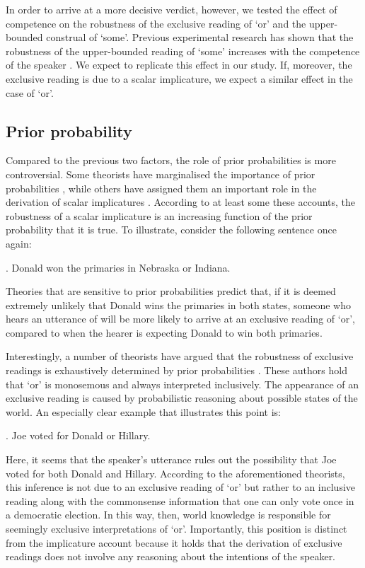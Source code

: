 \documentclass[12pt]{article}
\begin{document}
In order to arrive at a more decisive verdict, however, we tested the effect of competence on the robustness of the exclusive reading of `or' and the upper-bounded construal of `some'. Previous experimental research has shown that the robustness of the upper-bounded reading of `some' increases with the competence of the speaker \citep{goodman2013}. We expect to replicate this effect in our study. If, moreover, the exclusive reading is due to a scalar implicature, we expect a similar effect in the case of `or'.

\subsection*{Prior probability}

Compared to the previous two factors, the role of prior probabilities is more controversial. Some theorists have marginalised the importance of prior probabilities \citep{geurts2010}, while others have assigned them an important role in the derivation of scalar implicatures \citep[e.g.,][]{Russell2012:Probabilistic-R,frank2012, FrankeJager2015:Probabilistic-p}. According to at least some these accounts, the robustness of a scalar implicature is an increasing function of the prior probability that it is true. To
illustrate, consider the following sentence once again:

\ex.	Donald won the primaries in Nebraska or Indiana.

Theories that are sensitive to prior probabilities predict that, if it is deemed extremely unlikely that Donald wins the primaries in both states, someone who hears an utterance of \Last will be more likely to arrive at an exclusive reading of `or', compared to when the hearer is expecting Donald to win both primaries.

Interestingly, a number of theorists have argued that the robustness of exclusive readings is exhaustively determined by prior probabilities \citep[e.g.,][]{rubin1989, yanal1988}. These authors hold that `or' is monosemous and always interpreted inclusively. The appearance of an exclusive reading is caused by probabilistic reasoning about possible states of the world. An especially clear example that illustrates this point is:

\ex.	Joe voted for Donald or Hillary.

Here, it seems that the speaker's utterance rules out the possibility that Joe voted for both Donald and Hillary. According to the aforementioned theorists, this inference is not due to an exclusive reading of `or' but rather to an inclusive reading along with the commonsense information that one can only vote once in a democratic election. In this way, then, world knowledge is responsible for seemingly exclusive interpretations of `or'. Importantly, this position is distinct from the implicature account because it holds that the derivation of exclusive readings does not involve any reasoning about the intentions of the speaker.
\end{document}
